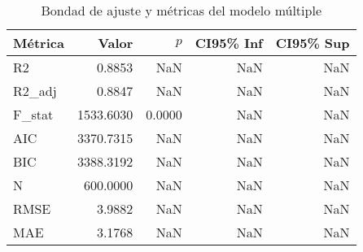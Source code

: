 \begin{table}
\caption{Bondad de ajuste y métricas del modelo múltiple}
\label{tab:ols_multiple_metrics}
\begin{tabular}{lrrrr}
\toprule
Métrica & Valor & $p$ & CI95\% Inf & CI95\% Sup \\
\midrule
R2 & 0.8853 & NaN & NaN & NaN \\
R2_adj & 0.8847 & NaN & NaN & NaN \\
F_stat & 1533.6030 & 0.0000 & NaN & NaN \\
AIC & 3370.7315 & NaN & NaN & NaN \\
BIC & 3388.3192 & NaN & NaN & NaN \\
N & 600.0000 & NaN & NaN & NaN \\
RMSE & 3.9882 & NaN & NaN & NaN \\
MAE & 3.1768 & NaN & NaN & NaN \\
\bottomrule
\end{tabular}
\end{table}
